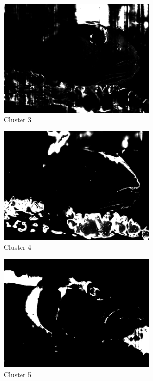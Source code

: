 \documentclass{article}      %
\begin{document}
\begin{figure}[H]
\centering
\includegraphics[width=0.7\textwidth]{partb_wts_cluster2}
\caption{Cluster 3}
\end{figure}

\begin{figure}[H]
\centering
\includegraphics[width=0.7\textwidth]{partb_wts_cluster3}
\caption{Cluster 4}
\end{figure}

\begin{figure}[H]
\centering
\includegraphics[width=0.7\textwidth]{partb_wts_cluster4}
\caption{Cluster 5}
\end{figure}
\end{document}
